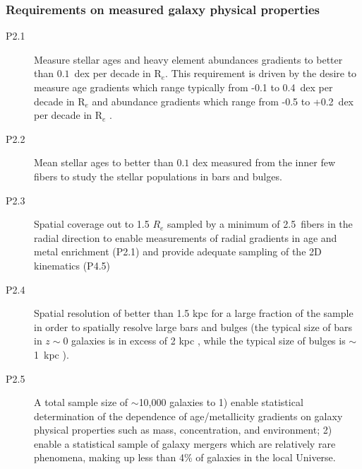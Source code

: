 \documentclass[preprint,11pt]{aastex}
\newcommand{\Reff}{{R$_{e}$}}
\begin{document}
\subsubsection{Requirements on measured galaxy physical properties}

\begin{description}

\item[P2.1] Measure stellar ages and heavy element abundances gradients to better
  than $0.1$~dex per decade in \Reff. This requirement is driven by the desire 
  to measure age gradients which range typically from -0.1 to 0.4~dex per decade in R$_e$ \citep{mehlert03,kuntschner10, spolaor10} and 
  abundance gradients which range from -0.5 to 
  +0.2~dex per decade in R$_e$ \citep{mehlert03,spolaor10, koleva11}.

\item[P2.2] Mean stellar ages to better than $0.1$ dex measured 
from the inner few fibers to study the stellar populations in bars 
and bulges.  



\item[P2.3] Spatial coverage out to 1.5 $R_e$ sampled by a minimum of
  2.5~fibers in the radial direction to enable measurements of radial
  gradients in age and metal enrichment (P2.1) and provide adequate
  sampling of the 2D kinematics (P4.5)

\item[P2.4] Spatial resolution of better than 1.5 kpc for a large
  fraction of the sample in order to spatially resolve large bars and
  bulges (the typical size of bars in $z\sim$0 galaxies is in excess
  of 2 kpc \citep{hoyle2011}, while the typical size of bulges is
  $\sim$1~kpc \citep{fisher2010}). 

\item[P2.5] A total sample size of $\sim$10,000 galaxies to 1) enable
  statistical determination of the dependence of age/metallicity
  gradients on galaxy physical properties such as mass, concentration,
  and environment; 2) enable a statistical sample of galaxy mergers
  which are relatively rare phenomena, making up less than 4\% of
  galaxies in the local Universe.

\end{description}
\end{document}
